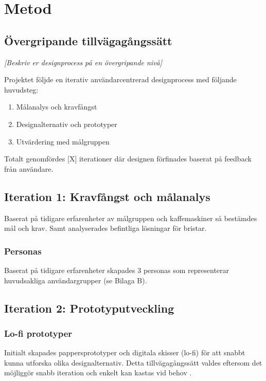 \section{Metod}

\subsection{Övergripande tillvägagångssätt}

\textit{[Beskriv er designprocess på en övergripande nivå]}

Projektet följde en iterativ användarcentrerad designprocess med följande huvudsteg:
\begin{enumerate}
    \item Målanalys och kravfångst
    \item Designalternativ och prototyper
    \item Utvärdering med målgruppen
\end{enumerate}

Totalt genomfördes [X] iterationer där designen förfinades baserat på feedback från användare.


\subsection{Iteration 1: Kravfångst och målanalys}

Baserat på tidigare erfarenheter av målgruppen och kaffemaskiner så bestämdes mål och krav. Samt analyserades befintliga lösningar för bristar.  

\subsubsection{Personas}

Baserat på tidigare erfarenheter skapades 3 personas som representerar huvudsakliga användargrupper (se Bilaga B). %


\subsection{Iteration 2: Prototyputveckling}

\subsubsection{Lo-fi prototyper}


Initialt skapades pappersprototyper och digitala skisser (lo-fi) för att snabbt kunna utforska olika designalternativ. Detta tillvägagångssätt valdes eftersom det möjliggör snabb iteration och enkelt kan kastas vid behov \cite{sharp2019}.

